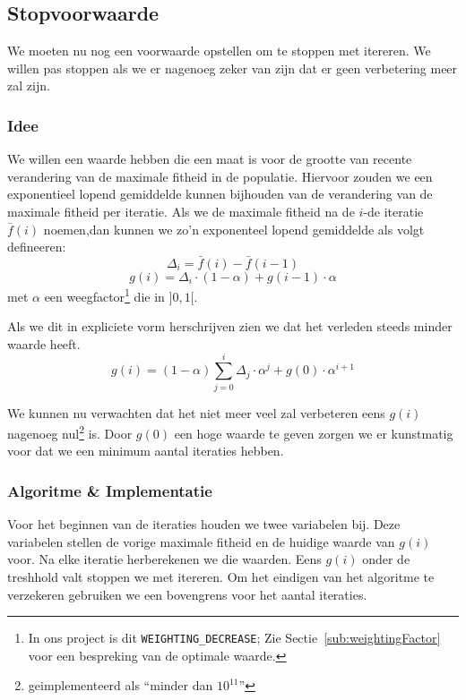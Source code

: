 %
\subsection{Stopvoorwaarde}
\label{ssub:stop_cond}
We moeten nu nog een voorwaarde opstellen om te stoppen met itereren. We willen pas stoppen als we er nagenoeg zeker van zijn dat er geen verbetering meer zal zijn.
\subsubsection{Idee}
We willen een waarde hebben die een maat is voor de grootte van recente verandering van de maximale fitheid in de populatie. Hiervoor zouden we een exponentieel lopend gemiddelde kunnen bijhouden van de verandering van de maximale fitheid per iteratie. Als we de maximale fitheid na de $i$-de iteratie $\bar f(i)$ noemen,dan kunnen we zo'n exponenteel lopend gemiddelde als volgt defineeren:
\[\Delta_i = \bar f(i) - \bar f(i-1)\]
\[g(i) =  \Delta_i \cdot (1-\alpha) + g(i-1)\cdot \alpha\]
met $\alpha$ een weegfactor\footnote{In ons project is dit \texttt{WEIGHTING\_DECREASE}; Zie Sectie~\ref{sub:weightingFactor} voor een bespreking van de optimale waarde.} die in $\rbrack 0,1 \lbrack$.

Als we dit in expliciete vorm herschrijven zien we dat het verleden steeds minder waarde heeft.
\[g(i) = (1-\alpha) \sum^i_{j=0} \Delta_j \cdot \alpha^j + g(0)\cdot \alpha^{i+1}\]

We kunnen nu verwachten dat het niet meer veel zal verbeteren eens $g(i)$ nagenoeg nul\footnote{geimplementeerd als ``minder dan $10^{11}$''} is. Door $g(0)$ een hoge waarde te geven zorgen we er kunstmatig voor dat we een minimum aantal iteraties hebben. 
 
\subsubsection{Algoritme \& Implementatie}
Voor het beginnen van de iteraties houden we twee variabelen bij. Deze variabelen stellen de vorige maximale fitheid en de huidige waarde van $g(i)$ voor. Na elke iteratie herberekenen we die waarden. Eens $g(i)$ onder de treshhold valt stoppen we met itereren. Om het eindigen van het algoritme te verzekeren gebruiken we een bovengrens voor het aantal iteraties.
 
%